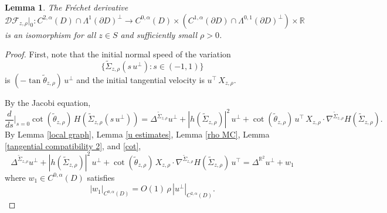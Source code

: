 \documentclass[11pt]{amsart}
\newtheorem{lem}[prop]{Lemma}
\begin{document}
\begin{lem} \label{isomorphism 2} 
 The Fr\'echet derivative
	$$
	\mathcal{D}\mathcal{F}_{z,\rho}|_{0}:C^{2,\alpha}(D)\cap \Lambda^{1}(\partial D)^\perp\to C^{0,\alpha}(D)\times \left(  C^{1,\alpha}(\partial D)\cap\Lambda^{0,1}(\partial D)^\perp\right)\times \mathbb{R}
	$$
	is an isomorphism for all $z\in S$ and  sufficiently small $\rho>0$.
\end{lem}
\begin{proof}

	
	First,	note that the initial normal speed of the variation $$\{\tilde \Sigma_{z,\rho}(s\,u^\perp):s\in(-1,1)\}$$  is $(-\tan\tilde \theta_{z,\rho})\,u^\perp$ and the initial tangential velocity is $u^\top\,X_{z,\rho}$. 
	
	By the Jacobi equation,
	$$
	\frac{d}{ds}\bigg|_{s=0}\cot(\tilde \theta_{z,\rho})\, H(\tilde \Sigma_{z,\rho}(s\,u^\perp))=\Delta^{\tilde \Sigma_{z,\rho}}u^\perp+|h(\tilde \Sigma_{z,\rho})|^2\,u^\perp+\cot(\tilde \theta_{z,\rho})\,u^\top\,X_{z,\rho}\cdot\nabla^{\tilde \Sigma_{z,\rho}} H(\tilde \Sigma_{z,\rho}).
	$$
	By Lemma \ref{local graph}, Lemma \ref{u estimates}, Lemma \ref{rho MC},   Lemma \ref{tangential compatibility 2}, and \eqref{cot},
	$$
	\Delta^{\tilde \Sigma_{z,\rho}}u^\perp+|h(\tilde \Sigma_{z,\rho})|^2\,u^\perp+\cot(\tilde \theta_{z,\rho})\, X_{z,\rho}\cdot \nabla^{\tilde \Sigma_{z,\rho}} H(\tilde \Sigma_{z,\rho})\,u^\top=\Delta^{\mathbb{R}^2}u^\perp+w_1
	$$
	where $w_1\in C^{0,\alpha}(D)$ satisfies 
	$$
	|w_1|_{C^{0,\alpha}(D)}=O(1)\,\rho\,|u^\perp|_{C^{2,\alpha}(D)}.
	$$ 
	

\end{proof}
\end{document}
